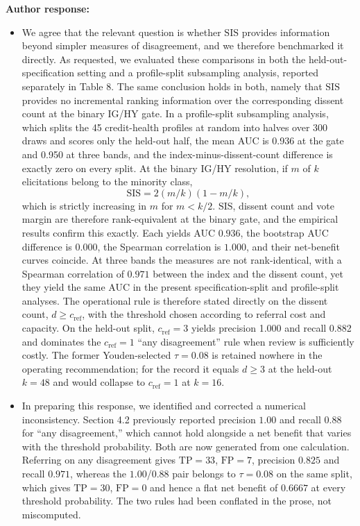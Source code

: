 \documentclass[11pt]{article}
\begin{document}
\textbf{Author response:}

\begin{itemize}
\item We agree that the relevant question is whether $\mathrm{SIS}$ provides information beyond simpler
measures of disagreement, and we therefore benchmarked it directly. As requested, we evaluated
these comparisons in both the held-out-specification setting and a profile-split subsampling analysis, reported
separately in Table 8. The same conclusion holds in both, namely that $\mathrm{SIS}$ provides no
incremental ranking information over the corresponding dissent count at the binary IG/HY gate. In
a profile-split subsampling analysis, which splits the 45 credit-health profiles at random into
halves over 300 draws and scores only the held-out half, the mean AUC is 0.936 at the gate and 0.950 at three bands, and the
index-minus-dissent-count difference is exactly zero on every split. At the binary IG/HY
resolution,
if $m$ of $k$ elicitations belong to the minority class,
\[
\mathrm{SIS}=2(m/k)(1-m/k),
\]
which is strictly increasing in $m$ for $m<k/2$. $\mathrm{SIS}$, dissent count and vote margin are
therefore rank-equivalent at the binary gate, and the empirical results confirm this exactly.
Each yields AUC $0.936$, the bootstrap AUC difference is $0.000$, the Spearman correlation is
$1.000$, and their net-benefit curves coincide. At three bands the measures are not rank-identical, with a Spearman correlation of $0.971$ between the index and the dissent count, yet they yield the same AUC in the present specification-split and profile-split analyses. The operational rule is therefore stated directly on the dissent count, $d\ge c_{\mathrm{ref}}$, with the threshold chosen according to referral cost and capacity. On the held-out split, $c_{\mathrm{ref}}=3$ yields precision 1.000 and recall 0.882 and dominates the $c_{\mathrm{ref}}=1$ ``any disagreement'' rule when review is sufficiently costly. The former Youden-selected $\tau=0.08$ is retained nowhere in the operating recommendation; for the record it equals $d\ge3$ at the held-out $k=48$ and would collapse to $c_{\mathrm{ref}}=1$ at $k=16$.
\item In preparing this response, we identified and corrected a numerical inconsistency. Section 4.2 previously reported precision $1.00$ and recall $0.88$ for ``any disagreement,'' which cannot hold alongside a net benefit that varies with the threshold probability. Both are now generated from one calculation. Referring on any disagreement gives $\mathrm{TP}=33$, $\mathrm{FP}=7$, precision $0.825$ and recall $0.971$, whereas the $1.00$/$0.88$ pair belongs to $\tau=0.08$ on the same split, which gives $\mathrm{TP}=30$, $\mathrm{FP}=0$ and hence a flat net benefit of $0.6667$ at every threshold probability. The two rules had been conflated in the prose, not miscomputed.

\end{itemize}
\end{document}
